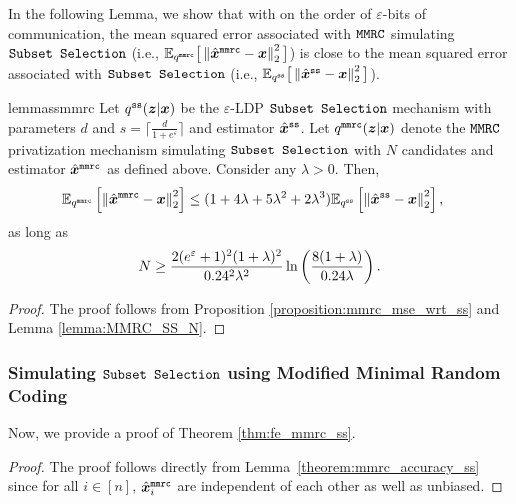In the following Lemma, we show that with on the order of $\varepsilon$-bits of communication, the mean squared error associated with $\texttt{MMRC}$ simulating $\texttt{Subset Selection}$ (i.e., $\mathbb{E}_{q^{\texttt{mmrc}}} \big[ \left\lVert  \hat{{\boldsymbol{x}}}^\texttt{mmrc} - {\boldsymbol{x}} \right\rVert^2_2  \big]$) is close to the mean squared error associated with $\texttt{Subset Selection}$ (i.e., $\mathbb{E}_{q^{\texttt{ss}}} \big[ \left\lVert  \hat{{\boldsymbol{x}}}^\texttt{ss} - {\boldsymbol{x}} \right\rVert^2_2  \big]$).
 \begin{restatable}{lemma}{ssmmrc}\label{theorem:mmrc_accuracy_ss}
 Let $q^{\texttt{ss}}({\boldsymbol{z}} | {\boldsymbol{x}})$ be the  $\varepsilon$-LDP \emph{$\texttt{Subset Selection}$} mechanism with parameters $d$ and $s=\lceil \frac{d}{1+e^\varepsilon} \rceil$ and estimator $\hat{{\boldsymbol{x}}}^{\texttt{ss}}$. Let $q^{\texttt{mmrc}}({\boldsymbol{z}}|{\boldsymbol{x}})$ denote the \emph{$\texttt{MMRC}$} privatization mechanism simulating \emph{$\texttt{Subset Selection}$} with $N$ candidates and estimator $\hat{{\boldsymbol{x}}}^{\texttt{mmrc}}$ as defined above. Consider any $\lambda > 0$. Then,
 \begin{align}
      & \mathbb{E}_{q^{\texttt{mmrc}}} \left[ \left\lVert \hat{{\boldsymbol{x}}}^{\texttt{mmrc}}  -  {\boldsymbol{x}}\right\rVert^2_2\right]   \leq  (1 + 4\lambda + 5\lambda^2 + 2\lambda^3) \mathbb{E}_{q^{\texttt{ss}}} \left[ \left\lVert \hat{{\boldsymbol{x}}}^{\texttt{ss}} - {\boldsymbol{x}}\right\rVert^2_2\right],
 \end{align}
  as long as 
 \begin{align}
      N\geq \frac{2(e^{\varepsilon}+1)^2(1+\lambda)^2}{0.24^2\lambda^2}\ln\left( \frac{8(1+\lambda)}{0.24\lambda}\right).
  \end{align}
 \end{restatable}
 \begin{proof}
The proof follows from Proposition \ref{proposition:mmrc_mse_wrt_ss} and Lemma \ref{lemma:MMRC_SS_N}.
\end{proof}
 
\subsubsection{Simulating \texorpdfstring{$\texttt{Subset Selection}$}{Subset Selection} using Modified Minimal Random Coding}\label{appendix:mmrc_ss_utility}
Now, we provide a proof of Theorem \ref{thm:fe_mmrc_ss}.
\mmrcss*
\begin{proof}
The proof follows directly from Lemma~\ref{theorem:mmrc_accuracy_ss} since for all $i \in [n]$, $\hat{{\boldsymbol{x}}}^{\texttt{mmrc}}_i$ are independent of each other as well as unbiased.
\end{proof}

